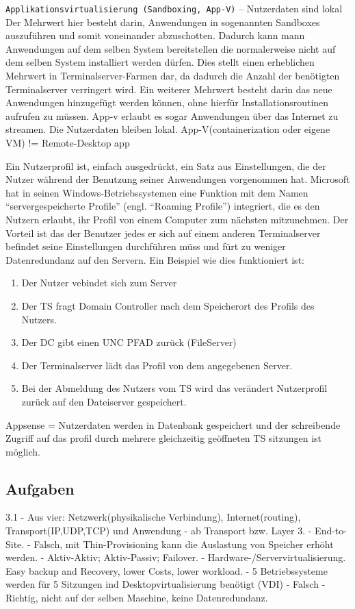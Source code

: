\documentclass[a4paper,10pt]{article}
\begin{document}
\texttt{Applikationsvirtualisierung (Sandboxing, App-V)} -- Nutzerdaten sind lokal \newline
Der Mehrwert hier besteht darin, Anwendungen in sogenannten Sandboxes auszuführen und somit voneinander abzuschotten. Dadurch kann mann Anwendungen auf dem selben System bereitstellen die normalerweise nicht auf dem selben System installiert werden dürfen. Dies stellt einen erheblichen Mehrwert in Terminalserver-Farmen dar, da dadurch die Anzahl der benötigten Terminalserver verringert wird. Ein weiterer Mehrwert besteht darin das neue Anwendungen hinzugefügt werden können, ohne hierfür Installationsroutinen aufrufen zu müssen. App-v erlaubt es sogar Anwendungen über das Internet zu streamen. Die Nutzerdaten bleiben lokal.
App-V(containerization oder eigene VM) != Remote-Desktop app \newline

\vspace{3mm}
Ein Nutzerprofil ist, einfach ausgedrückt, ein Satz aus Einstellungen, die der Nutzer während der Benutzung seiner Anwendungen vorgenommen hat. Microsoft hat in seinen Windows-Betriebssystemen eine Funktion mit dem Namen ``servergespeicherte Profile'' (engl. ``Roaming Profile'') integriert, die es den Nutzern erlaubt, ihr Profil von einem Computer zum nächsten mitzunehmen. Der Vorteil ist das der Benutzer jedes er sich auf einem anderen Terminalserver befindet seine Einstellungen durchführen müss und fürt zu weniger Datenredundanz auf den Servern. Ein Beispiel wie dies funktioniert ist:
\begin{enumerate}
	\item Der Nutzer vebindet sich zum Server
	\item Der TS fragt Domain Controller nach dem Speicherort des Profils des Nutzers.
	\item Der DC gibt einen UNC PFAD zurück (FileServer)
	\item Der Terminalserver lädt das Profil von dem angegebenen Server.
	\item Bei der Abmeldung des Nutzers vom TS wird das verändert Nutzerprofil zurück auf den Dateiserver gespeichert.
\end{enumerate}
Appsense = Nutzerdaten werden in Datenbank gespeichert und der schreibende Zugriff auf das profil durch mehrere gleichzeitig geöffneten TS sitzungen ist möglich.

\subsection{Aufgaben}
3.1 - Aus vier: Netzwerk(physikalische Verbindung), Internet(routing), Transport(IP,UDP,TCP) und Anwendung  - ab Transport bzw. Layer 3.  - End-to-Site.  - Falsch, mit Thin-Provisioning kann die Auslastung von Speicher erhöht werden.  - Aktiv-Aktiv; Aktiv-Passiv; Failover.  - Hardware-/Servervirtualisierung. Easy backup and Recovery, lower Costs, lower workload.  - 5 Betriebssysteme werden für 5 Sitzungen ind Desktopvirtualisierung benötigt (VDI)  - Falsch  - Richtig, nicht auf der selben Maschine, keine Datenredundanz.
\end{document}
